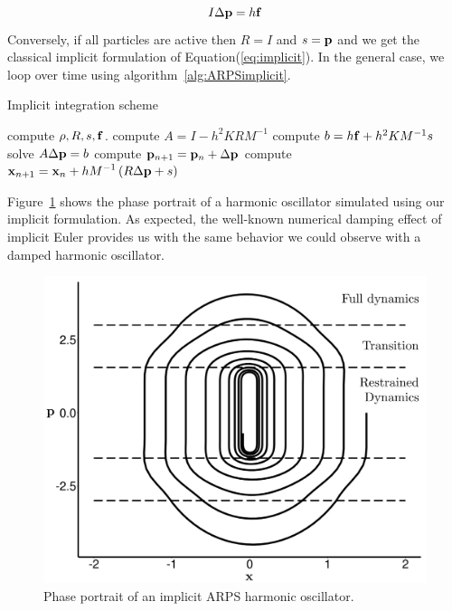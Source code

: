 \begin{equation}
    \label{eq:ARPSImplicitRestrained}
    I \Delta \mathbf{p} = h \mathbf{f}
\end{equation}
Conversely, if all particles are active then $R = I$ and $s = \mathbf{p}$ and we get the classical implicit formulation of Equation(\ref{eq:implicit}).
In the general case, we loop over time using algorithm~\ref{alg:ARPSimplicit}.
\begin{algorithm}[H]
    \caption[ARPS: Implicit integration scheme]{Implicit integration scheme}
    \label{alg:ARPSimplicit}
    \begin{algorithmic}[10]
	    \State compute $\rho, R, s, \mathbf{f}$.
	    \State compute $A = I - h^{2}KRM^{-1}$
	    \State compute $b = h \mathbf{f} + h^{2}KM^{-1}s$
	    \State solve $A \Delta \mathbf{p} = b$
            \State compute $\mathbf{p}_{n+1} = \mathbf{p}_{n} + \Delta \mathbf{p}$
	    \State compute $\displaystyle \mathbf{x}_{n+1} = \mathbf{x}_{n} +
            hM^{-1}\left( R\Delta \mathbf{p}+ s \right)$
	\EndFor
    \end{algorithmic}
\end{algorithm}

Figure~\ref{fig:implicitHOPP} shows the phase portrait of a harmonic oscillator simulated using our implicit formulation.
As expected, the well-known numerical damping effect of implicit Euler provides us with the same behavior we could observe with a damped harmonic oscillator.

\begin{figure}[!h]
	\centering
	\includegraphics[width=0.8\linewidth]{images/arps-vriphys2013/implicitHOPPraw_hacked.png}
	\caption[ARPS: Phase portrait of an implicit ARPS harmonic oscillator]{\label{fig:implicitHOPP} Phase portrait of an implicit ARPS harmonic oscillator.}
\end{figure}

